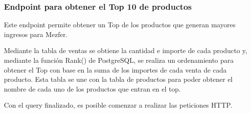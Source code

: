 \subsubsection{Endpoint para obtener el Top 10 de productos}
Este endpoint permite obtener un Top de los productos que generan mayores ingresos para Mezfer.

Mediante la tabla de ventas se obtiene la cantidad e importe de cada producto y, mediante la función Rank() de PostgreSQL, se realiza un ordenamiento para obtener el Top con base en la suma de los importes de cada venta de cada producto. Esta tabla se une con la tabla de productos para poder obtener el nombre de cada uno de los productos que entran en el top.

Con el query finalizado, es posible comenzar a realizar las peticiones HTTP.\@